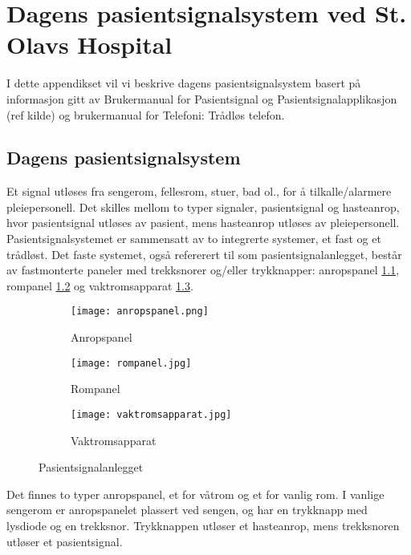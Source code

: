 \chapter{Dagens pasientsignalsystem ved St. Olavs Hospital}
\label{appendix_dagenssystem}
 
I dette appendikset vil vi beskrive dagens pasientsignalsystem basert på informasjon gitt av Brukermanual for Pasientsignal og Pasientsignalapplikasjon (ref kilde) og brukermanual for Telefoni: Trådløs telefon.

\section{Dagens pasientsignalsystem}
Et signal utløses fra sengerom, fellesrom, stuer, bad ol., for å tilkalle/alarmere pleiepersonell. Det skilles mellom to typer signaler, pasientsignal og hasteanrop, hvor pasientsignal utløses av pasient, mens hasteanrop utløses av pleiepersonell. 
Pasientsignalsystemet er sammensatt av to integrerte systemer, et fast og et trådløst. Det faste systemet, også refererert til som pasientsignalanlegget, består av fastmonterte paneler med trekksnorer og/eller trykknapper: anropspanel \ref{anropspanel}, rompanel \ref{rompanel} og vaktromsapparat \ref{vaktromsapparat}.

\begin{figure}[H]
        \centering
        \begin{subfigure}[b]{0.3\textwidth}
        		\centering
                \texttt{[image: anropspanel.png]}
                \caption{Anropspanel}
                \label{anropspanel}
        \end{subfigure}%
        \begin{subfigure}[b]{0.3\textwidth}
        		\centering
                \texttt{[image: rompanel.jpg]}
                \caption{Rompanel}
                \label{rompanel}
        \end{subfigure}
        \begin{subfigure}[b]{0.3\textwidth}
        		\centering
                \texttt{[image: vaktromsapparat.jpg]}
                \caption{Vaktromsapparat}
                \label{vaktromsapparat}
        \end{subfigure}
        \caption{Pasientsignalanlegget}\label{pasientsignalanlegget}
\end{figure}
\noindent
Det finnes to typer anropspanel, et for våtrom og et for vanlig rom. I vanlige sengerom er anropspanelet plassert ved sengen, og har en trykknapp med lysdiode og en trekksnor.
Trykknappen utløser et hasteanrop, mens trekksnoren utløser et pasientsignal.

